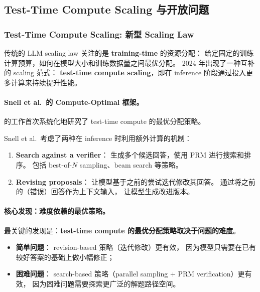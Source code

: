 \subsection{Test-Time Compute Scaling 与开放问题}
\label{sec:t4-open}

\subsubsection{Test-Time Compute Scaling: 新型 Scaling Law}
\label{sec:t4-ttc}

传统的 LLM scaling law \cite{kaplan2020scaling,hoffmann2022chinchilla}
关注的是 \textbf{training-time} 的资源分配：
给定固定的训练计算预算，如何在模型大小和训练数据量之间最优分配。
2024 年出现了一种互补的 scaling 范式：
\textbf{test-time compute scaling}，即在 inference 阶段通过投入更多计算来持续提升性能。

\paragraph{Snell et al.\ 的 Compute-Optimal 框架。}
 的工作首次系统化地研究了
test-time compute 的最优分配策略。

Snell et al.\ 考虑了两种在 inference 时利用额外计算的机制：
\begin{enumerate}[leftmargin=2em]
  \item \textbf{Search against a verifier}：
    生成多个候选回答，使用 PRM 进行搜索和排序。
    包括 best-of-$N$ sampling、beam search 等策略。

  \item \textbf{Revising proposals}：
    让模型基于之前的尝试迭代修改其回答。
    通过将之前的（错误）回答作为上下文输入，
    让模型生成改进版本。
\end{enumerate}

\paragraph{核心发现：难度依赖的最优策略。}
最关键的发现是：\textbf{test-time compute 的最优分配策略取决于问题的难度}。
\begin{itemize}[leftmargin=2em]
  \item \textbf{简单问题}：
    revision-based 策略（迭代修改）更有效，
    因为模型只需要在已有较好答案的基础上做小幅修正；
  \item \textbf{困难问题}：
    search-based 策略（parallel sampling + PRM verification）更有效，
    因为困难问题需要探索更广泛的解题路径空间。
\end{itemize}

